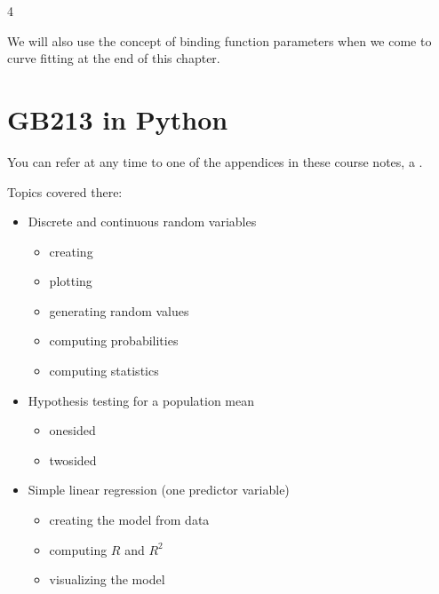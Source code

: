 \documentclass[letterpaper,10pt,english]{sphinxmanual}
\begin{document}
\begin{sphinxVerbatim}[commandchars=\\\{\}]
4
\end{sphinxVerbatim}

We will also use the concept of binding function parameters when we come to curve fitting at the end of this chapter.


\section{GB213 in Python}
\label{\detokenize{chapter-9-math-and-stats:gb213-in-python}}
You can refer at any time to one of the appendices in these course notes, a {\hyperref[\detokenize{GB213-review-in-Python::doc}]{}}.

Topics covered there:
\begin{itemize}
\item {} 
Discrete and continuous random variables
\begin{itemize}
\item {} 
creating

\item {} 
plotting

\item {} 
generating random values

\item {} 
computing probabilities

\item {} 
computing statistics

\end{itemize}

\item {} 
Hypothesis testing for a population mean
\begin{itemize}
\item {} 
one\sphinxhyphen{}sided

\item {} 
two\sphinxhyphen{}sided

\end{itemize}

\item {} 
Simple linear regression (one predictor variable)
\begin{itemize}
\item {} 
creating the model from data

\item {} 
computing \(R\) and \(R^2\)

\item {} 
visualizing the model

\end{itemize}

\end{itemize}
\end{document}
